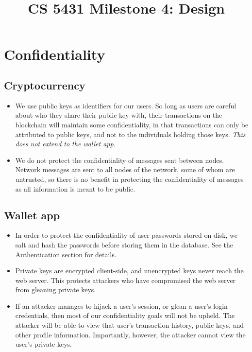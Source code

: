 \documentclass[a4paper,12pt]{article}
\title{CS 5431 Milestone 4: Design}
\author{
\iam{James Cassell}{jcc384}
\and
\iam{Evan King}{esk79}
\and
\iam{Ethan Koenig}{etk39}
\and
\iam{Eric Perdew}{ecp84}
\and
\iam{Will Ronchetti}{wrr33}
}
\begin{document}
\maketitle

\section{Confidentiality}

\subsection{Cryptocurrency}

\begin{itemize}
\item  We use public keys as identifiers for our users. So long as users are careful about who they share their public key with, their transactions on the blockchain will maintain some confidentiality, in that transactions can only be attributed to public keys, and not to the individuals holding those keys.
\textit{This does not extend to the wallet app.}
\item We do not protect the confidentiality of messages sent between nodes.
Network messages are sent to all nodes of the network, some of whom are untrusted, so there is no benefit in protecting the confidentiality of messages as all information is meant to be public.
\end{itemize}

\subsection{Wallet app}

\begin{itemize}
\item In order to protect the confidentiality of user passwords stored on disk, we salt and hash the passwords before storing them in the database. See the Authentication section for details.
\item Private keys are encrypted client-side, and unencrypted keys never reach the web server. This protects attackers who have compromised the web server from gleaning private keys.
\item If an attacker manages to hijack a user's session, or glean a user's login credentials, then most of our confidentiality goals will not be upheld. The attacker will be able to view that user's transaction history, public keys, and other profile information. Importantly, however, the attacker cannot view the user's private keys.
\end{itemize}
\end{document}
